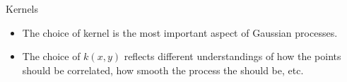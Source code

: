 \documentclass[10pt]{beamer}
\begin{document}

\begin{frame}{Kernels}
  \begin{itemize}
  \item The choice of kernel is the most important aspect of Gaussian processes. 
  \item The choice of $k(x,y)$ reflects different understandings of how the points should be correlated, how smooth the process the should be, etc. 
  \end{itemize}
  \begin{center}
  \end{center}
\end{frame}
\end{document}
